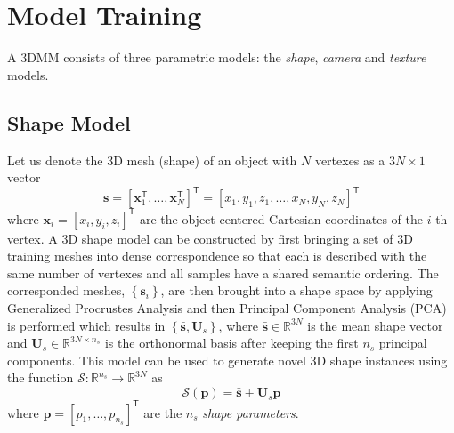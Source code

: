 %
\section{Model Training}
\label{sec:training}

A 3DMM consists of three parametric models: the \emph{shape},
\emph{camera} and \emph{texture} models.

%
%
%
\subsection{Shape Model}
Let us denote the 3D mesh (shape) of an object with $N$ vertexes as a
$3N\times 1$ vector
%
\begin{equation}
\mathbf{s} = {\left[\mathbf{x}_1^\mathsf{T}, \ldots, \mathbf{x}_N^\mathsf{T}\right]}^\mathsf{T} = {\left[x_1, y_1, z_1, \ldots, x_N, y_N, z_N\right]}^\mathsf{T}
\label{equ:3D_shape_vector}
\end{equation}
%
where $\mathbf{x}_i={\left[x_i, y_i, z_i\right]}^\mathsf{T}$ are the
object-centered Cartesian coordinates of the $i$-th vertex. A 3D shape model can be constructed by first bringing a set of 3D training meshes into dense correspondence so that each is described with the same number of vertexes and all samples have a shared semantic ordering.
The corresponded meshes, $\left\lbrace\mathbf{s}_i\right\rbrace$, are then brought into a shape space by applying Generalized Procrustes Analysis and then Principal Component Analysis (PCA) is performed which results in
$\left\lbrace\bar{\mathbf{s}}, \mathbf{U}_s\right\rbrace$, where
$\bar{\mathbf{s}}\in\mathbb{R}^{3N}$ is the mean shape vector and
$\mathbf{U}_s\in\mathbb{R}^{3N\times n_s}$ is the orthonormal basis after
keeping the first $n_s$ principal components. This model can be used to
generate novel 3D shape instances using the function
$\mathcal{S}: \mathbb{R}^{n_s} \rightarrow \mathbb{R}^{3N}$ as
%
\begin{equation}
\mathcal{S}(\mathbf{p}) = \bar{\mathbf{s}} + \mathbf{U}_s \mathbf{p}
\label{equ:shape_instance}
\end{equation}
%
where $\mathbf{p}={\left[p_1,\ldots,p_{n_s}\right]}^\mathsf{T}$ are the $n_s$ \emph{shape parameters}.


